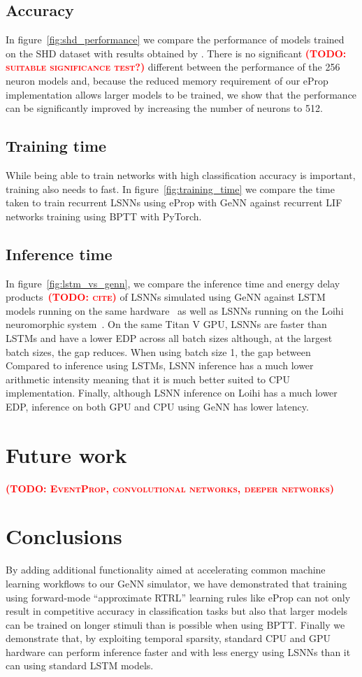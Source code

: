 \documentclass[sigconf,authordraft]{acmart}
\newcommand{\todo}[1]{\textbf{\textsc{\textcolor{red}{(TODO: #1)}}}}
\begin{document}
\subsection{Accuracy}
\label{sec:accuracy}
In figure~\ref{fig:shd_performance} we compare the performance of models trained on the SHD dataset with results obtained by \citet{Zenke2021a}.
There is no significant \todo{suitable significance test?} different between the performance of the \num{256} neuron models and, because the reduced memory requirement of our eProp implementation allows larger models to be trained, we show that the performance can be significantly improved by increasing the number of neurons to \num{512}.

\subsection{Training time}
\label{sec:training_time}
While being able to train networks with high classification accuracy is important, training also needs to fast.
In figure~\ref{fig:training_time} we compare the time taken to train recurrent LSNNs using eProp with GeNN against recurrent LIF networks training using BPTT with PyTorch.

\subsection{Inference time}
\label{sec:inference_time}
In figure~\ref{fig:lstm_vs_genn}, we compare the inference time and energy delay products~\todo{cite} of LSNNs simulated using GeNN against LSTM models running on the same hardware~\citep{Plank2021} as well as LSNNs running on the Loihi neuromorphic system~\citep{Davies2018}.
On the same Titan V GPU, LSNNs are faster than LSTMs and have a lower EDP across all batch sizes although, at the largest batch sizes, the gap reduces.
When using batch size 1, the gap between 
Compared to inference using LSTMs, LSNN inference has a much lower arithmetic intensity meaning that it is much better suited to CPU implementation.
Finally, although LSNN inference on Loihi has a much lower EDP, inference on both GPU and CPU using GeNN has lower latency.

\section{Future work}
\todo{EventProp, convolutional networks, deeper networks}

\section{Conclusions}
By adding additional functionality aimed at accelerating common machine learning workflows to our GeNN simulator, we have demonstrated that training using forward-mode ``approximate RTRL'' learning rules like eProp can not only result in competitive accuracy in classification tasks but also that larger models can be trained on longer stimuli than is possible when using BPTT.
Finally we demonstrate that, by exploiting temporal sparsity, standard CPU and GPU hardware can perform inference faster and with less energy using LSNNs than it can using standard LSTM models.
\end{document}
